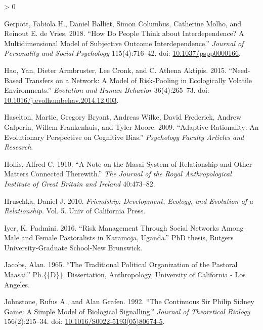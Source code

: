 \documentclass[
]{article}
\newlength{\cslhangindent}
\newenvironment{CSLReferences}[2] %
 {%
  \setlength{\parindent}{0pt}
  \ifodd #1 \everypar{\setlength{\hangindent}{\cslhangindent}}\ignorespaces\fi
  \ifnum #2 > 0
  \setlength{\parskip}{#2\baselineskip}
  \fi
 }%
 {}
\begin{document}
\begin{CSLReferences}{1}{0}
\leavevmode\hypertarget{ref-gerpottHowPeopleThink2018}{}%
Gerpott, Fabiola H., Daniel Balliet, Simon Columbus, Catherine Molho, and Reinout E. de Vries. 2018. {``How Do People Think about Interdependence? {A} Multidimensional Model of Subjective Outcome Interdependence.''} \emph{Journal of Personality and Social Psychology} 115(4):716--42. doi: \href{https://doi.org/10.1037/pspp0000166}{10.1037/pspp0000166}.

\leavevmode\hypertarget{ref-haoNeedbasedTransfersNetwork2015}{}%
Hao, Yan, Dieter Armbruster, Lee Cronk, and C. Athena Aktipis. 2015. {``Need-Based Transfers on a Network: A Model of Risk-Pooling in Ecologically Volatile Environments.''} \emph{Evolution and Human Behavior} 36(4):265--73. doi: \href{https://doi.org/10.1016/j.evolhumbehav.2014.12.003}{10.1016/j.evolhumbehav.2014.12.003}.

\leavevmode\hypertarget{ref-haseltonAdaptiveRationalityEvolutionary2009a}{}%
Haselton, Martie, Gregory Bryant, Andreas Wilke, David Frederick, Andrew Galperin, Willem Frankenhuis, and Tyler Moore. 2009. {``Adaptive Rationality: {An} Evolutionary Perspective on Cognitive Bias.''} \emph{Psychology Faculty Articles and Research}.

\leavevmode\hypertarget{ref-hollisNoteMasaiSystem1910}{}%
Hollis, Alfred C. 1910. {``A {Note} on the {Masai System} of {Relationship} and {Other Matters Connected Therewith}.''} \emph{The Journal of the Royal Anthropological Institute of Great Britain and Ireland} 40:473--82.

\leavevmode\hypertarget{ref-hruschkaFriendshipDevelopmentEcology2010}{}%
Hruschka, Daniel J. 2010. \emph{Friendship: {Development}, Ecology, and Evolution of a Relationship}. Vol. 5. {Univ of California Press}.

\leavevmode\hypertarget{ref-iyer2016risk}{}%
Iyer, K. Padmini. 2016. {``Risk Management Through Social Networks Among Male and Female Pastoralists in Karamoja, Uganda.''} PhD thesis, Rutgers University-Graduate School-New Brunswick.

\leavevmode\hypertarget{ref-jacobsTraditionalPoliticalOrganization1965}{}%
Jacobs, Alan. 1965. {``The Traditional Political Organization of the Pastoral {Maasai}.''} Ph.\{\{D\}\}. Dissertation, Anthropology, University of California - Los Angeles.

\leavevmode\hypertarget{ref-johnstoneContinuousSirPhilip1992}{}%
Johnstone, Rufus A., and Alan Grafen. 1992. {``The Continuous {Sir Philip Sidney} Game: {A} Simple Model of Biological Signalling.''} \emph{Journal of Theoretical Biology} 156(2):215--34. doi: \href{https://doi.org/10.1016/S0022-5193(05)80674-5}{10.1016/S0022-5193(05)80674-5}.


\end{CSLReferences}
\end{document}
